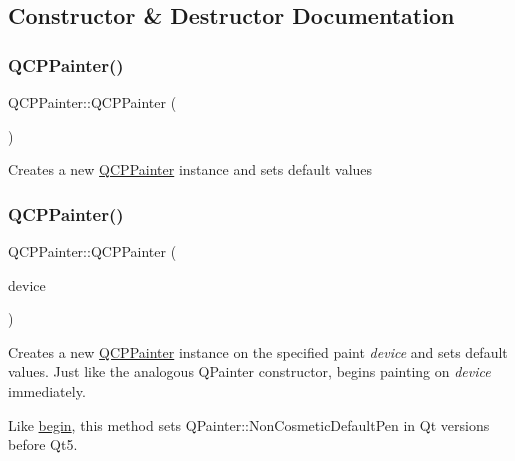 \subsection{Constructor \& Destructor Documentation}
\mbox{\label{class_q_c_p_painter_a3c52cb0f43f34573d29bea487da28fe8}} 
\subsubsection{\texorpdfstring{Q\+C\+P\+Painter()}{QCPPainter()}\hspace{0.1cm}{\footnotesize\ttfamily [1/2]}}
{\footnotesize\ttfamily Q\+C\+P\+Painter\+::\+Q\+C\+P\+Painter (\begin{DoxyParamCaption}{ }\end{DoxyParamCaption})}

Creates a new \mbox{\hyperlink{class_q_c_p_painter}{Q\+C\+P\+Painter}} instance and sets default values \mbox{\label{class_q_c_p_painter_ae58dbb1795ddc4351ab324dc9898aa22}} 
\subsubsection{\texorpdfstring{Q\+C\+P\+Painter()}{QCPPainter()}\hspace{0.1cm}{\footnotesize\ttfamily [2/2]}}
{\footnotesize\ttfamily Q\+C\+P\+Painter\+::\+Q\+C\+P\+Painter (\begin{DoxyParamCaption}\item[{Q\+Paint\+Device $\ast$}]{device }\end{DoxyParamCaption})\hspace{0.3cm}{\ttfamily [explicit]}}

Creates a new \mbox{\hyperlink{class_q_c_p_painter}{Q\+C\+P\+Painter}} instance on the specified paint {\itshape device} and sets default values. Just like the analogous Q\+Painter constructor, begins painting on {\itshape device} immediately.

Like \mbox{\hyperlink{class_q_c_p_painter_a0a41146ccd619dceab6e25ec7b46b044}{begin}}, this method sets Q\+Painter\+::\+Non\+Cosmetic\+Default\+Pen in Qt versions before Qt5. 

